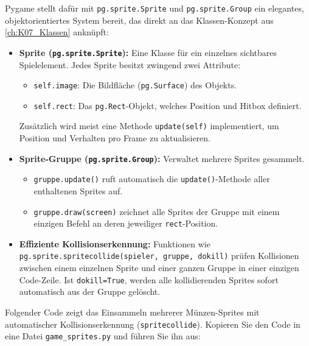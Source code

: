 Pygame stellt dafür mit \lstinline|pg.sprite.Sprite| und \lstinline|pg.sprite.Group| ein elegantes, objektorientiertes System bereit, das direkt an das Klassen-Konzept aus \cref{ch:K07_Klassen} anknüpft:
\begin{itemize}
    \item \textbf{Sprite (\lstinline|pg.sprite.Sprite|):} Eine Klasse für ein einzelnes sichtbares Spielelement. Jedes Sprite besitzt zwingend zwei Attribute:
    \begin{itemize}
        \item \lstinline|self.image|: Die Bildfläche (\lstinline|pg.Surface|) des Objekts.
        \item \lstinline|self.rect|: Das \lstinline|pg.Rect|-Objekt, welches Position und Hitbox definiert.
    \end{itemize}
    Zusätzlich wird meist eine Methode \lstinline|update(self)| implementiert, um Position und Verhalten pro Frame zu aktualisieren.
    \item \textbf{Sprite-Gruppe (\lstinline|pg.sprite.Group|):} Verwaltet mehrere Sprites gesammelt.
    \begin{itemize}
        \item \lstinline|gruppe.update()| ruft automatisch die \lstinline|update()|-Methode aller enthaltenen Sprites auf.
        \item \lstinline|gruppe.draw(screen)| zeichnet alle Sprites der Gruppe mit einem einzigen Befehl an deren jeweiliger \lstinline|rect|-Position.
    \end{itemize}
    \item \textbf{Effiziente Kollisionserkennung:} Funktionen wie \lstinline|pg.sprite.spritecollide(spieler, gruppe, dokill)| prüfen Kollisionen zwischen einem einzelnen Sprite und einer ganzen Gruppe in einer einzigen Code-Zeile. Ist \lstinline|dokill=True|, werden alle kollidierenden Sprites sofort automatisch aus der Gruppe gelöscht.
\end{itemize}

\begin{myexample}
Folgender Code zeigt das Einsammeln mehrerer Münzen-Sprites mit automatischer Kollisionserkennung (\lstinline|spritecollide|). Kopieren Sie den Code in eine Datei \texttt{game\_sprites.py} und führen Sie ihn aus:

\end{myexample}

